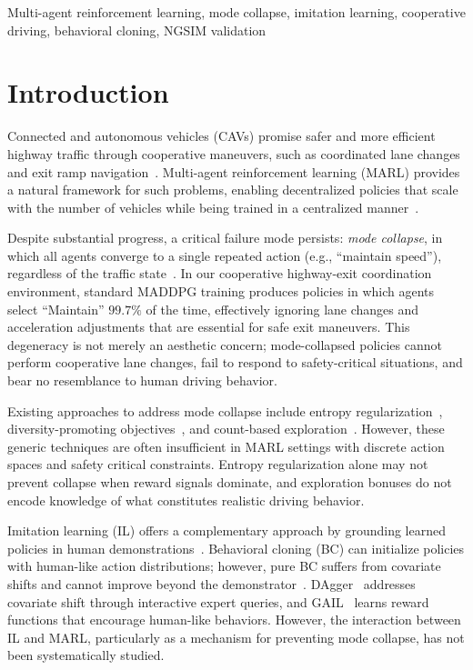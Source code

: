 \documentclass[journal]{IEEEtran}
\begin{document}
\begin{IEEEkeywords}
Multi-agent reinforcement learning, mode collapse, imitation learning, cooperative driving, behavioral cloning, NGSIM validation
\end{IEEEkeywords}

\section{Introduction}
\label{sec:intro}

Connected and autonomous vehicles (CAVs) promise safer and more efficient highway traffic through cooperative maneuvers, such as coordinated lane changes and exit ramp navigation~\cite{guanetti2018control,wang2021cooperative}.
Multi-agent reinforcement learning (MARL) provides a natural framework for such problems, enabling decentralized policies that scale with the number of vehicles while being trained in a centralized manner~\cite{lowe2017multi,rashid2018qmix}.

Despite substantial progress, a critical failure mode persists: \emph{mode collapse}, in which all agents converge to a single repeated action (e.g., ``maintain speed''), regardless of the traffic state~\cite{haarnoja2018soft}.
In our cooperative highway-exit coordination environment, standard MADDPG training produces policies in which agents select ``Maintain'' $99.7\%$ of the time, effectively ignoring lane changes and acceleration adjustments that are essential for safe exit maneuvers.
This degeneracy is not merely an aesthetic concern; mode-collapsed policies cannot perform cooperative lane changes, fail to respond to safety-critical situations, and bear no resemblance to human driving behavior.

Existing approaches to address mode collapse include entropy regularization~\cite{haarnoja2018soft,ahmed2019understanding}, diversity-promoting objectives~\cite{eysenbach2019diversity}, and count-based exploration~\cite{tang2017exploration}.
However, these generic techniques are often insufficient in MARL settings with discrete action spaces and safety critical constraints. Entropy regularization alone may not prevent collapse when reward signals dominate, and exploration bonuses do not encode knowledge of what constitutes realistic driving behavior.

Imitation learning (IL) offers a complementary approach by grounding learned policies in human demonstrations~\cite{ross2011reduction,ho2016generative}.
Behavioral cloning (BC) can initialize policies with human-like action distributions; however, pure BC suffers from covariate shifts and cannot improve beyond the demonstrator~\cite{pomerleau1991efficient}.
DAgger~\cite{ross2011reduction} addresses covariate shift through interactive expert queries, and GAIL~\cite{ho2016generative} learns reward functions that encourage human-like behaviors.
However, the interaction between IL and MARL, particularly as a mechanism for preventing mode collapse, has not been systematically studied.
\end{document}
